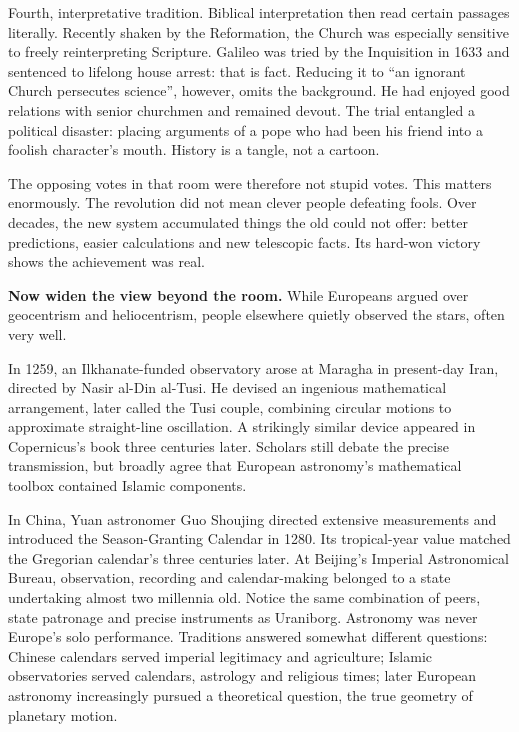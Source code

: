 Fourth, interpretative tradition. Biblical interpretation then read certain passages literally. Recently shaken by the Reformation, the Church was especially sensitive to freely reinterpreting Scripture. Galileo was tried by the Inquisition in 1633 and sentenced to lifelong house arrest: that is fact. Reducing it to ``an ignorant Church persecutes science'', however, omits the background. He had enjoyed good relations with senior churchmen and remained devout. The trial entangled a political disaster: placing arguments of a pope who had been his friend into a foolish character's mouth. History is a tangle, not a cartoon.

The opposing votes in that room were therefore not stupid votes. This matters enormously. The revolution did not mean clever people defeating fools. Over decades, the new system accumulated things the old could not offer: better predictions, easier calculations and new telescopic facts. Its hard-won victory shows the achievement was real.

\textbf{Now widen the view beyond the room.} While Europeans argued over geocentrism and heliocentrism, people elsewhere quietly observed the stars, often very well.

In 1259, an Ilkhanate-funded observatory arose at Maragha in present-day Iran, directed by Nasir al-Din al-Tusi. He devised an ingenious mathematical arrangement, later called the Tusi couple, combining circular motions to approximate straight-line oscillation. A strikingly similar device appeared in Copernicus's book three centuries later. Scholars still debate the precise transmission, but broadly agree that European astronomy's mathematical toolbox contained Islamic components.

In China, Yuan astronomer Guo Shoujing directed extensive measurements and introduced the Season-Granting Calendar in 1280. Its tropical-year value matched the Gregorian calendar's three centuries later. At Beijing's Imperial Astronomical Bureau, observation, recording and calendar-making belonged to a state undertaking almost two millennia old. Notice the same combination of peers, state patronage and precise instruments as Uraniborg. Astronomy was never Europe's solo performance. Traditions answered somewhat different questions: Chinese calendars served imperial legitimacy and agriculture; Islamic observatories served calendars, astrology and religious times; later European astronomy increasingly pursued a theoretical question, the true geometry of planetary motion.

